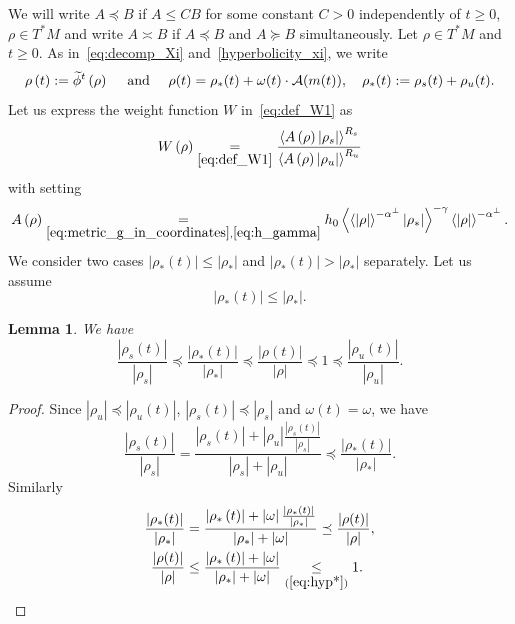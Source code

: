 \documentclass[10pt]{amsart}
\newtheorem{lemm}[theo]{Lemma}\newtheorem{prop}[theo]{Proposition}\newtheorem{coro}[theo]{Corollary}\newtheorem{conj}[theo]{Conjecture}
\theoremstyle{definition}\newtheorem{defi}[theo]{Definition}\newtheorem{rema}[theo]{Remark}\newtheorem{exam}[theo]{Example}\newtheorem{exem}[theo]{Example}\newtheorem{nota}[theo]{Notation}
\newcommand*\ineq[1]{\underset{(#1)}{\leq}}
\newcommand{\clA}{\mathcal{A}}
\let\oldtilde\tilde
\renewcommand*{\tilde}[1]{\mathchoice{\widetilde{#1}}{\widetilde{#1}}{\oldtilde{#1}}{\oldtilde{#1}}}
\begin{document}
We will write $A\preceq B$ if $A\le CB$ for some constant $C>0$ independently of $t\geq0$, $\rho\in T^{*}M$ and write $A\asymp B$ if $A\preceq B$ and $A\succeq B$ simultaneously. Let $\rho\in T^{*}M$ and $t\geq0$. As in~\eqref{eq:decomp_Xi} and~\eqref{hyperbolicity_xi}, we write
\[
\rho\left(t\right):=\tilde{\phi}^{t}\left(\rho\right)\quad\text{ and }\quad\rho(t)=\rho_{*}(t)+\omega(t)\cdot\clA(m(t)),\quad\rho_{*}(t):=\rho_{s}(t)+\rho_{u}(t).
\]
Let us express the weight function $W$ in~\eqref{eq:def_W1} as
\begin{equation}\label{eq:W2}
W\left(\rho\right)\underset{\eqref{eq:def_W1}}{=}\frac{\left\langle A\left(\rho\right)\left|\rho_{s}\right|\right\rangle ^{R_{s}}}{\left\langle A\left(\rho\right)\left|\rho_{u}\right|\right\rangle ^{R_{u}}}
\end{equation}
with setting
\begin{equation}\label{eq:def_A}
A\left(\rho\right)\underset{\eqref{eq:metric_g_in_coordinates},\eqref{eq:h_gamma}}{=}h_{0}\left\langle \left\langle \left|\rho\right|\right\rangle ^{-\alpha^{\perp}}\left|\rho_{*}\right|\right\rangle ^{-\gamma}\left\langle \left|\rho\right|\right\rangle ^{-\alpha^{\perp}}.
\end{equation}
We consider two cases $\left|\rho_{*}(t)\right|\leq\left|\rho_{*}\right|$ and $\left|\rho_{*}(t)\right|>\left|\rho_{*}\right|$ separately. Let us assume
\begin{equation}\label{eq:hyp*}
\left|\rho_{*}(t)\right|\leq\left|\rho_{*}\right|.
\end{equation}

\begin{lemm}
We have
\begin{equation}\label{eq:rationXi}
\frac{|\rho_{s}(t)|}{|\rho_{s}|}\preceq\frac{|\rho_{*}(t)|}{|\rho_{*}|}\preceq\frac{|\rho(t)|}{|\rho|}\preceq1\preceq\frac{|\rho_{u}(t)|}{|\rho_{u}|}.
\end{equation}
\end{lemm}

\begin{proof}
Since $|\rho_{u}|\preceq|\rho_{u}(t)|$, $|\rho_{s}(t)|\preceq|\rho_{s}|$ and $\omega(t)=\omega$, we have
\[
\frac{|\rho_{s}(t)|}{|\rho_{s}|}=\frac{\left|\rho_{s}\left(t\right)\right|+\left|\rho_{u}\right|\frac{\left|\rho_{s}\left(t\right)\right|}{\left|\rho_{s}\right|}}{\left|\rho_{s}\right|+\left|\rho_{u}\right|}\preceq\frac{|\rho_{*}(t)|}{|\rho_{*}|}.
\]
Similarly
\begin{align*}
\frac{|\rho_{*}(t)|}{|\rho_{*}|} &=\frac{\left|\rho_{*}\left(t\right)\right|+\left|\omega\right|\frac{\left|\rho_{*}\left(t\right)\right|}{\left|\rho_{*}\right|}}{\left|\rho_{*}\right|+\left|\omega\right|}\preceq\frac{|\rho(t)|}{|\rho|},
\\
\frac{|\rho(t)|}{|\rho|} &\leq\frac{\left|\rho_{*}\left(t\right)\right|+\left|\omega\right|}{\left|\rho_{*}\right|+\left|\omega\right|}\ineq{\ref{eq:hyp*}}1.\qedhere
\end{align*}
\end{proof}
\end{document}
